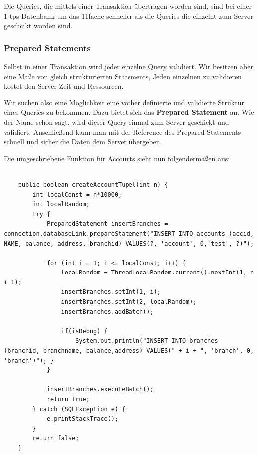  
Die Queries, die mittels einer Transaktion übertragen worden sind, sind bei
einer 1-tps-Datenbank um \ca das 11fache schneller als die Queries die einzelnt
zum Server geschcikt worden sind.

\begin{figure}[!htbp] 
\end{figure} 


\subsubsection{Prepared Statements}
Selbst in einer Transaktion wird jeder einzelne Query validiert. Wir besitzen
aber eine Maße von gleich strukturierten Statements,  Jeden einzelnen zu
validieren kostet den Server Zeit und Ressourcen.
 
 Wir suchen also eine Möglichkeit eine vorher definierte und validierte Struktur
 eines Queries zu bekommen. Dazu bietet sich das \textbf{Prepared Statement} an.
 Wie der Name schon sagt, wird dieser Query einmal zum Server geschickt und
 validiert. Anschließend kann man mit der Reference des Prepared Statements
 schnell und sicher die Daten dem Server übergeben.
 
Die umgeschriebene Funktion für Accounts sieht nun folgendermaßen aus:
 \begin{lstlisting}

	public boolean createAccountTupel(int n) {
		int localConst = n*10000;
		int localRandom;		
		try {
			PreparedStatement insertBranches = connection.databaseLink.prepareStatement("INSERT INTO accounts (accid, NAME, balance, address, branchid) VALUES(?, 'account', 0,'test', ?)");
			
			for (int i = 1; i <= localConst; i++) {
				localRandom = ThreadLocalRandom.current().nextInt(1, n + 1);
				insertBranches.setInt(1, i);
				insertBranches.setInt(2, localRandom);
				insertBranches.addBatch();
				
				if(isDebug) {
					System.out.println("INSERT INTO branches (branchid, branchname, balance,address) VALUES(" + i + ", 'branch', 0, 'branch')"); }
			}

			insertBranches.executeBatch();
			return true;
		} catch (SQLException e) {
			e.printStackTrace();
		}
		return false;
	}
 \end{lstlisting}

